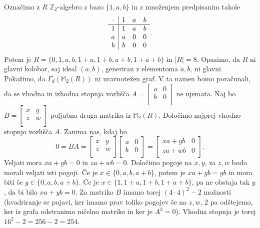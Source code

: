 \documentclass[a4paper, 12pt]{amsart}
\theoremstyle{definition} %
\theoremstyle{plain} %
\newcommand{\Z}{\mathbb Z}
\newcommand{\M}{\mathbb M}
\begin{document}
Označimo z $R$ $\Z_2$-algebro z bazo $\{1,a,b\}$ in z množenjem predpisanim takole
$$
\begin{array}{c | ccc}
\cdot & 1 & a & b \\
\hline
1 & 1 & a & b \\
a & a & 0 & 0 \\
b & b & 0 & 0 \\
\end{array}.
$$
Potem je $R=\{0,1,a,b,1+a,1+b,a+b,1+a+b\}$ in $|R|=8$. Opazimo, da $R$ ni glavni kolobar, saj ideal  $(a,b)$, generiran z elementoma $a,b$, ni glavni. Pokažimo, da $\Gamma_d(\M_2(R))$ ni uravnotežen graf. V ta namen bomo poračunali, da se vhodna  in izhodna stopnja vozlišča 
$A=
\begin{bmatrix}
a & 0 \\
b & 0 \\
\end{bmatrix}
$ ne ujemata.
Naj bo $B=
\begin{bmatrix}
x & y \\
z & w \\
\end{bmatrix}
$
poljubna druga matrika iz $\M_2(R)$. Določimo najprej vhodno stopnjo vozlišča $A$. Zanima nas, kdaj bo
$$
0=BA = \begin{bmatrix}
x & y \\
z & w \\
\end{bmatrix}
\begin{bmatrix}
a & 0 \\
b & 0 \\
\end{bmatrix}
=
\begin{bmatrix}
xa + yb & 0 \\
za + wb & 0 \\
\end{bmatrix}.
$$
Veljati mora $xa + yb = 0 $ in $za+wb = 0$. Določimo pogoje na $x,y$, za $z,w$ bodo morali veljati isti pogoji. Če je $x\in \{0,a,b,a+b\}$, potem je $xa + yb = yb$ in mora biti še $y\in \{0,a,b,a+b\}$. Če  je $x\in \{1,1+a,1+b,1+a+b\}$, pa ne obstaja tak $y$, da bi bilo $xa+yb=0$. Za matriko $B$ imamo torej $(4\cdot 4)^2 -2$ možnosti (kvadriranje se pojavi, ker imamo prav toliko pogojev še na $z,w$, 2 pa odštejemo, ker iz grafa odstranimo ničelno matriko in ker je $A^2 = 0$). Vhodna stopnja je torej $16^2 - 2= 256-2 = 254$. 
\end{document}
